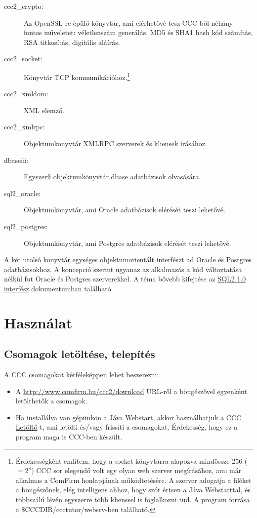 \begin{description}
\item[ccc2\_crypto:]
    Az OpenSSL-re épülő könyvtár, ami elérhetővé tesz CCC-ből
    néhány fontos műveletet: 
    véletlenszám generálás,
    MD5 és SHA1 hash kód számítás,
    RSA titkosítás,
    digitális aláírás.
\item[ccc2\_socket:]
    Könyvtár TCP kommunikációhoz.\footnote{
    Érdekességként említem, hogy a socket könyvtárra
    alapozva mindössze 256 ($=2^8$) CCC sor elegendő volt 
    egy olyan web szerver megírásához, ami már alkalmas 
    a ComFirm honlapjának működtetésére. A szerver adogatja a 
    filéket a böngészőnek, elég intelligens ahhoz, hogy szót értsen
    a Jáva Webstarttal, és többszálú lévén egyszerre több klienssel
    is foglalkozni tud. A program forrása a \$CCCDIR/ccctutor/websrv-ben 
    található.}
\item[ccc2\_xmldom:]
    XML elemző.
\item[ccc2\_xmlrpc:]
    Objektumkönyvtár XMLRPC szerverek és kliensek írásához. 
\item[dbaseiii:]
    Egyszerű objektumkönyvtár dbase adatbázisok olvasására.
\item[sql2\_oracle:]
    Objektumkönyvtár, ami Oracle adatbázisok elérését teszi lehetővé.
\item[sql2\_postgres:]
    Objektumkönyvtár, ami Postgres adatbázisok elérését teszi lehetővé.
\end{description}

A két utolsó könyvtár egységes objektumorientált interfészt
ad Oracle és Postgres adatbázisokhoz. A koncepció szerint ugyanaz
az alkalmazás a kód változtatása nélkül fut Oracle és Postgres
szerverekkel. A téma bővebb kifejtése az
\href{sql2.html}{SQL2 1.0 interfész} 
dokumentumban található.


 
\section{Használat}

\subsection{Csomagok letöltése, telepítés}

A CCC csomagokat kétféleképpen lehet beszerezni:
\begin{itemize}
\item 
  A \href{http://www.comfirm.hu/ccc2/download}{http://www.comfirm.hu/ccc2/download}
  URL-ről a böngészővel egyenként letölthetők a csomagok.
\item 
  Ha installálva van gépünkön a Jáva Webstart, akkor használhatjuk a
  \href{http://www.comfirm.hu/jnlp/cccdown.jnlp}{CCC Letöltő}-t,
  ami letölti és/vagy frissíti a csomagokat.
  Érdekesség, hogy ez a program maga is CCC-ben készült.
\end{itemize}
 
